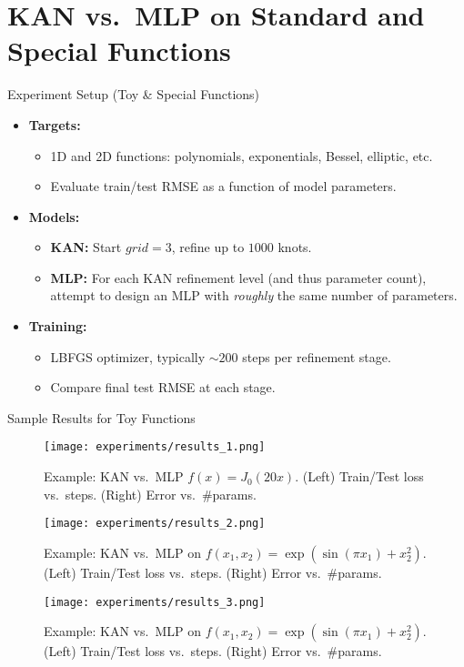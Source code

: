 \documentclass{beamer}
\begin{document}
\section{KAN vs.\ MLP on Standard and Special Functions}
\begin{frame}{Experiment Setup (Toy \& Special Functions)}
    \begin{itemize}
        \item \textbf{Targets:}
              \begin{itemize}
                  \item 1D and 2D functions: polynomials, exponentials, Bessel, elliptic, etc.
                  \item Evaluate train/test RMSE as a function of model parameters.
              \end{itemize}
        \item \textbf{Models:}
              \begin{itemize}
                  \item \textbf{KAN:} Start $grid = 3$, refine up to $1000$ knots.
                  \item \textbf{MLP:} For each KAN refinement level (and thus parameter count), attempt to design an MLP with \emph{roughly} the same number of parameters.
              \end{itemize}
        \item \textbf{Training:}
              \begin{itemize}
                  \item LBFGS optimizer, typically $\sim 200$ steps per refinement stage.
                  \item Compare final test RMSE at each stage.
              \end{itemize}
    \end{itemize}
\end{frame}

\begin{frame}{Sample Results for Toy Functions}
    \begin{figure}[h]
        \centering
        \texttt{[image: experiments/results\_1.png]}
        \caption{Example: KAN vs.\ MLP $f(x) = J_0(20x)$. (Left) Train/Test loss vs.\ steps. (Right) Error vs.\ \#params.}
    \end{figure}
    \begin{figure}[h]
        \centering
        \texttt{[image: experiments/results\_2.png]}
        \caption{Example: KAN vs.\ MLP on $f(x_1, x_2) = \exp(\sin(\pi x_1) + x_2^2)$. (Left) Train/Test loss vs.\ steps. (Right) Error vs.\ \#params.}
    \end{figure}
    \begin{figure}[h]
        \centering
        \texttt{[image: experiments/results\_3.png]}
        \caption{Example: KAN vs.\ MLP on $f(x_1, x_2) = \exp(\sin(\pi x_1) + x_2^2)$. (Left) Train/Test loss vs.\ steps. (Right) Error vs.\ \#params.}
    \end{figure}
\end{frame}
\end{document}
